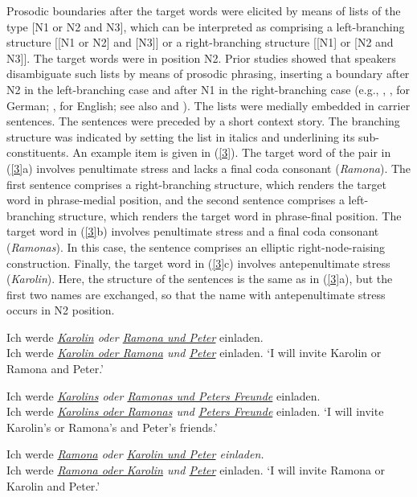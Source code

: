 \documentclass[output=paper]{langscibook}
\begin{document}
Prosodic boundaries after the target words were elicited by means of lists of the type [N1 or N2 and N3], which can be interpreted as comprising a left-branching structure [[N1 or N2] and [N3]] or a right-branching structure [[N1] or [N2 and N3]]. The target words were in position N2. Prior studies showed that speakers disambiguate such lists by means of prosodic phrasing, inserting a boundary after N2 in the left-branching case and after N1 in the right-branching case (e.g., \citealt{KentnerFery2013}, \citealt{PetroneEtal2017}, \citealt{huttenlauchetal2021} for German; \citealt{Wagner2005}, \citealt{TurkShattuck-Hufnagel2007} for English; see also  and ). The lists were medially embedded in carrier sentences. The sentences were preceded by a short context story. The branching structure was indicated by setting the list in italics and underlining its sub-constituents. An example item is given in (\ref{3}). The target word of the pair in (\ref{3}a) involves penultimate stress and lacks a final coda consonant (\textit{Ramona}). The first sentence comprises a right-branching structure, which renders the target word in phrase-medial position, and the second sentence comprises a left-branching structure, which renders the target word in phrase-final position. The target word in (\ref{3}b) involves penultimate stress and a final coda consonant (\textit{Ramonas}). In this case, the sentence comprises an elliptic right-node-raising construction. Finally, the target word in (\ref{3}c) involves antepenultimate stress (\textit{Karolin}). Here, the structure of the sentences is the same as in (\ref{3}a), but the first two names are exchanged, so that the name with antepenultimate stress occurs in N2 position.\largerpage

\ea\label{3}
    \ea Ich werde \textit{\uline{Karolin} oder \uline{Ramona und Peter}} einladen.\\    
    Ich werde \textit{\uline{Karolin oder Ramona} und \uline{Peter}} einladen.
    \glt ‘I will invite Karolin or Ramona and Peter.’
    
    \ex Ich werde \textit{\uline{Karolins} oder \uline{Ramonas und Peters Freunde}} einladen.\\    
    Ich werde \textit{\uline{Karolins oder Ramonas} und \uline{Peters Freunde}} einladen.
    \glt ‘I will invite Karolin's or Ramona's and Peter's friends.’
    
    \ex Ich werde \textit{\uline{Ramona} oder \uline{Karolin und Peter} einladen.}\\    
    Ich werde \textit{\uline{Ramona oder Karolin} und \uline{Peter}} einladen.
    \glt ‘I will invite Ramona or Karolin and Peter.’
    \z
\z
\end{document}
